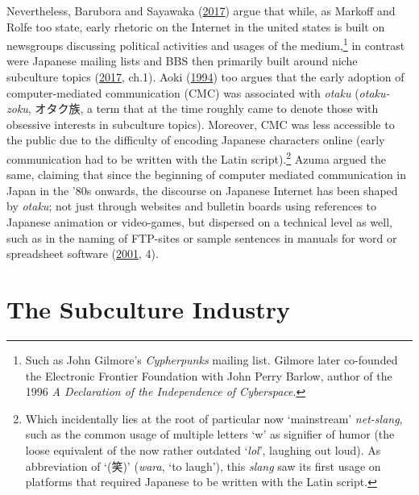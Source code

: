 \documentclass[10pt,british,A4paper,oneside]{memoir}
\begin{document}
Nevertheless, Barubora and Sayawaka
(\protect\hyperlink{ref-barubora_eng:_2017}{2017}) argue that while, as
Markoff and Rolfe too state, early rhetoric on the Internet in the united states
is built on newsgroups discussing political activities and usages of the
medium,\footnote{Such as John Gilmore's \emph{Cypherpunks} mailing list.
  Gilmore later co-founded the Electronic Frontier Foundation with John
  Perry Barlow, author of the 1996 \emph{A Declaration of the
  Independence of Cyberspace}.} in contrast were Japanese mailing lists
and BBS then primarily built around niche subculture topics
(\protect\hyperlink{ref-barubora_eng:_2017}{2017}, ch.1). Aoki
(\protect\hyperlink{ref-aoki_virtual_1994}{1994}) too argues that the
early adoption of computer-mediated communication (CMC) was associated with
\emph{otaku} (\emph{otaku-zoku}, オタク族, a term that at the time
roughly came to denote those with obsessive interests in subculture
topics). Moreover, CMC was less accessible to the public due to the
difficulty of encoding Japanese characters online (early communication
had to be written with the Latin script).\footnote{Which incidentally
  lies at the root of particular now `mainstream' \emph{net-slang}, such
  as the common usage of multiple letters `w' as signifier of humor (the
  loose equivalent of the now rather outdated `\emph{lol}', laughing out
  loud). As abbreviation of `(笑)' (\emph{wara}, `to laugh'), this
  \emph{slang} saw its first usage on platforms that required Japanese
  to be written with the Latin script.} Azuma argued the same, claiming
that since the beginning of computer mediated communication in Japan in
the '80s onwards, the discourse on Japanese Internet has been shaped by
\emph{otaku}; not just through websites and bulletin boards using
references to Japanese animation or video-games, but dispersed on a
technical level as well, such as in the naming of FTP-sites or sample
sentences in manuals for word or spreadsheet software
(\protect\hyperlink{ref-azuma_otaku:_2001}{2001}, 4).

\section{The Subculture Industry}\label{the-subculture-industry}
\end{document}
